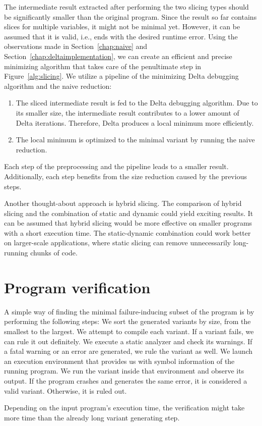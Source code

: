 The intermediate result extracted after performing the two slicing types 
should be significantly smaller than the original program.
Since the result so far contains slices for multiple variables, it might not 
be minimal yet.
However, it can be assumed that it is valid, i.e., ends with the desired 
runtime error.
Using the observations made in Section~\ref{chap:naive} and 
Section~\ref{chap:deltaimplementation}, we can create an efficient and 
precise minimizing algorithm that takes care of the penultimate step 
in Figure~\ref{alg:slicing}. 
We utilize a pipeline of the minimizing Delta debugging algorithm and 
the naive reduction:
\begin{enumerate}
  \item The sliced intermediate result is fed to the Delta debugging 
  algorithm. 
  Due to its smaller size, the intermediate result contributes to a lower 
  amount of Delta iterations. 
  Therefore, Delta produces a local minimum more efficiently.
  \item The local minimum is optimized to the minimal variant by running 
  the naive reduction.
\end{enumerate}
Each step of the preprocessing and the pipeline leads to a smaller result. 
Additionally, each step benefits from the size reduction caused by 
the previous steps.

Another thought-about approach is hybrid slicing.
The comparison of hybrid slicing and the combination of static and dynamic 
could yield exciting results.
It can be assumed that hybrid slicing would be more effective on smaller 
programs with a short execution time.
The static-dynamic combination could work better on larger-scale 
applications, where static slicing can remove unnecessarily long-running 
chunks of code.

\section{Program verification}\label{chap:verification}



A simple way of finding the minimal failure-inducing subset of the program is by performing the following steps:
We sort the generated variants by size, from the smallest to the largest.
We attempt to compile each variant. If a variant fails, we can rule it out definitely.
We execute a static analyzer and check its warnings. If a fatal warning or an error are generated, we rule the variant as well.
We launch an execution environment that provides us with symbol information of the running program. We run the variant inside that environment and observe its output. If the program crashes and generates the same error, it is considered a valid variant. Otherwise, it is ruled out.

Depending on the input program's execution time, the verification might take 
more time than the already long variant generating step.